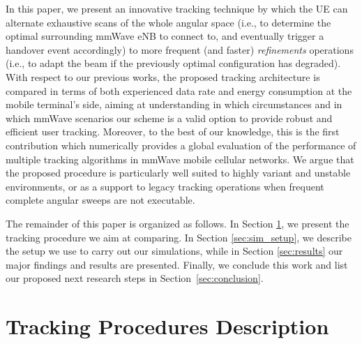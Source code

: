 \documentclass[conference]{IEEEtran}
\begin{document}
In this paper, we present an innovative tracking technique by which the UE can  alternate exhaustive scans of the whole angular space (i.e., to determine the optimal surrounding mmWave eNB to connect to, and eventually trigger a handover event accordingly) to more frequent (and faster) \emph{refinements} operations (i.e., to adapt the beam if the previously optimal configuration has degraded).
With respect to our previous works, the proposed tracking architecture is compared in terms of both experienced data rate and energy consumption at the mobile terminal's side, aiming at understanding in which circumstances and in which mmWave scenarios our scheme is a valid option to provide robust and efficient user tracking. Moreover, to the best of our knowledge, this is the first contribution which numerically provides a global evaluation of the performance of multiple tracking algorithms in mmWave mobile cellular networks. 
We argue that the proposed procedure is particularly well suited to highly variant and unstable environments, or as a support to  legacy tracking operations when frequent complete angular sweeps are not executable.

The remainder of this paper is organized as follows. In Section \ref{sec:procedures}, we present the tracking procedure we aim at comparing. In Section \ref{sec:sim_setup}, we describe the setup we use to carry out our simulations, while in Section \ref{sec:results} our major findings and results are presented. Finally, we conclude this work and  list our proposed next research steps in Section~\ref{sec:conclusion}.



\section{Tracking Procedures Description}
\label{sec:procedures}

%
\end{document}

